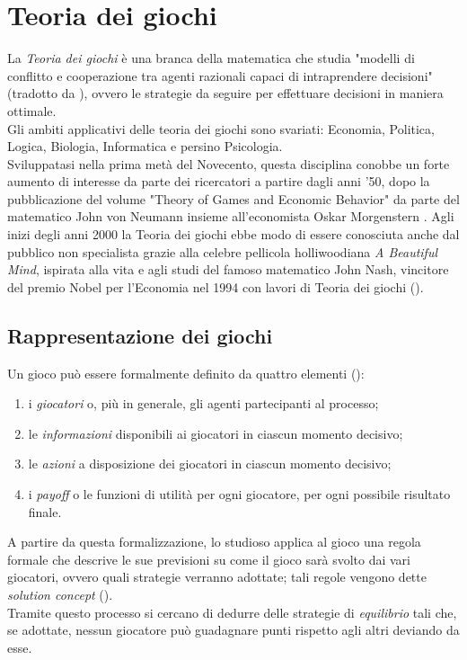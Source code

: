 \section{Teoria dei giochi}

La \emph{Teoria dei giochi} è una branca della matematica che studia "modelli di conflitto e cooperazione tra agenti razionali capaci di intraprendere decisioni" (tradotto da \cite{gtheory}), ovvero le strategie da seguire per effettuare decisioni in maniera ottimale.\\
Gli ambiti applicativi delle teoria dei giochi sono svariati: Economia, Politica, Logica, Biologia, Informatica e persino Psicologia.\\
Sviluppatasi nella prima metà del Novecento, questa disciplina conobbe un forte aumento di interesse da parte dei ricercatori a partire dagli anni '50, dopo la pubblicazione del volume "Theory of Games and Economic Behavior" da parte del matematico John von Neumann insieme all'economista Oskar Morgenstern \cite{tog}. Agli inizi degli anni 2000 la Teoria dei giochi ebbe modo di essere conosciuta anche dal pubblico non specialista grazie alla celebre pellicola holliwoodiana \emph{A Beautiful Mind}, ispirata alla vita e agli studi del famoso matematico John Nash, vincitore del premio Nobel per l'Economia nel 1994 con lavori di Teoria dei giochi (\cite{jnash}).


\subsection{Rappresentazione dei giochi}

Un gioco può essere formalmente definito da quattro elementi (\cite{ramusen}):
\begin{enumerate}
   \item i \emph{giocatori} o, più in generale, gli agenti partecipanti al processo;
   \item le \emph{informazioni} disponibili ai giocatori in ciascun momento decisivo;
   \item le \emph{azioni} a disposizione dei giocatori in ciascun momento decisivo;
   \item i \emph{payoff} o le funzioni di utilità per ogni giocatore, per ogni possibile risultato finale.   
\end{enumerate}

A partire da questa formalizzazione, lo studioso applica al gioco una regola formale che descrive le sue previsioni su come il gioco sarà svolto dai vari giocatori, ovvero quali strategie verranno adottate; tali regole vengono dette \emph{solution concept} (\cite{wikisol}).\\
Tramite questo processo si cercano di dedurre delle strategie di \emph{equilibrio} tali che, se adottate, nessun giocatore può guadagnare punti rispetto agli altri deviando da esse.


